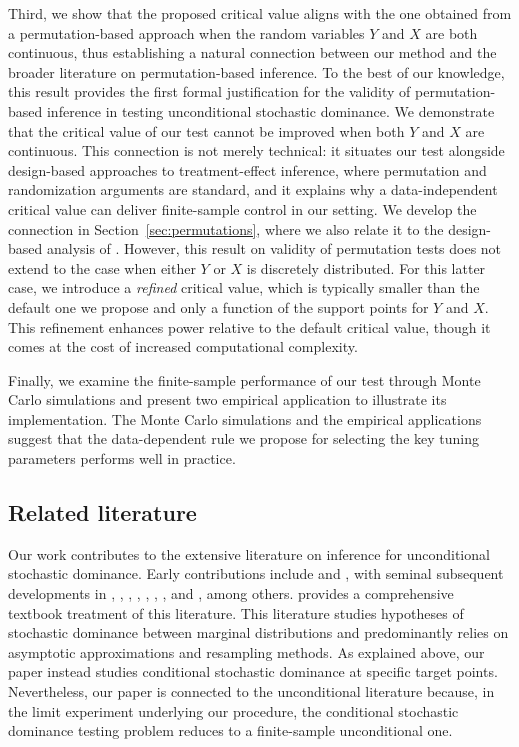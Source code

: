 \documentclass[11pt]{article}
\numberwithin{equation}{section}
\begin{document}
Third, we show that the proposed critical value aligns with the one obtained from a permutation-based approach when the random variables $Y$ and $X$ are both continuous, thus establishing a natural connection between our method and the broader literature on permutation-based inference. To the best of our knowledge, this result provides the first formal justification for the validity of permutation-based inference in testing unconditional stochastic dominance. We demonstrate that the critical value of our test cannot be improved when both $Y$ and $X$ are continuous. This connection is not merely technical: it situates our test alongside design-based approaches to treatment-effect inference, where permutation and randomization arguments are standard, and it explains why a data-independent critical value can deliver finite-sample control in our setting. We develop the connection in Section~\ref{sec:permutations}, where we also relate it to the design-based analysis of \citet{caughey/etal:2023}. However, this result on validity of permutation tests does not extend to the case when either $Y$ or $X$ is discretely distributed. For this latter case, we introduce a \emph{refined} critical value, which is typically smaller than the default one we propose and only a function of the support points for $Y$ and $X$. This refinement enhances power relative to the default critical value, though it comes at the cost of increased computational complexity. 

Finally, we examine the finite-sample performance of our test through Monte Carlo simulations and present two empirical application to illustrate its implementation. The Monte Carlo simulations and the empirical applications suggest that the data-dependent rule we propose for selecting the key tuning parameters performs well in practice.

\subsection*{Related literature}

Our work contributes to the extensive literature on inference for unconditional stochastic dominance. Early contributions include \cite{hodges:1958} and \cite{mcfadden:1989}, with seminal subsequent developments in \cite{anderson:1996}, \cite{davidson/duclos:2000}, \cite{abadie:2002}, \cite{barrett/donald:2003}, \cite{Linton/maasoumi/whang:2005}, \cite{linton/song/whang:2010}, \cite{davidson/duclos:2013}, and \cite{lok/tabri:2021}, among others. \citet{whang:2019} provides a comprehensive textbook treatment of this literature. This literature studies hypotheses of stochastic dominance between marginal distributions and predominantly relies on asymptotic approximations and resampling methods. As explained above, our paper instead studies conditional stochastic dominance at specific target points. Nevertheless, our paper is connected to the unconditional literature because, in the limit experiment underlying our procedure, the conditional stochastic dominance testing problem reduces to a finite-sample unconditional one.
\end{document}

